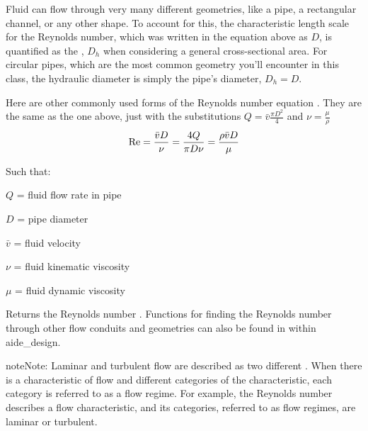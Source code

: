 \documentclass[letterpaper,10pt,english]{sphinxmanual}
\begin{document}
Fluid can flow through very many different geometries, like a pipe, a rectangular channel, or any other shape. To account for this, the characteristic length scale for the Reynolds number, which was written in the equation above as \(D\), is quantified as the , \(D_h\) when considering a general cross-sectional area. For circular pipes, which are the most common geometry you’ll encounter in this class, the hydraulic diameter is simply the pipe’s diameter, \(D_h = D\).

Here are other commonly used forms of the Reynolds number equation . They are the same as the one above, just with the substitutions \(Q = \bar v \frac{\pi D^2}{4}\) and \(\nu = \frac{\mu}{\rho}\)
\begin{equation}\label{equation:Review/Review_Fluid_Mechanics:reynolds_number_equation}
\begin{split}  {\rm Re} = \frac{\bar vD}{\nu} = \frac{4Q}{\pi D\nu} = \frac{\rho \bar vD}{\mu}\end{split}
\end{equation}
\begin{DUlineblock}{0em}
\item[] Such that:
\item[] \(Q\) = fluid flow rate in pipe
\item[] \(D\) = pipe diameter
\item[] \(\bar v\) = fluid velocity
\item[] \(\nu\) = fluid kinematic viscosity
\item[] \(\mu\) = fluid dynamic viscosity
\end{DUlineblock}




  Returns the Reynolds number . Functions for finding the Reynolds number through other flow conduits and geometries can also be found in  within aide\_design.



\begin{sphinxadmonition}{note}{Note:}
 Laminar and turbulent flow are described as two different . When there is a characteristic of flow and different categories of the characteristic, each category is referred to as a flow regime. For example, the Reynolds number describes a flow characteristic, and its categories, referred to as flow regimes, are laminar or turbulent.
\end{sphinxadmonition}
\end{document}
